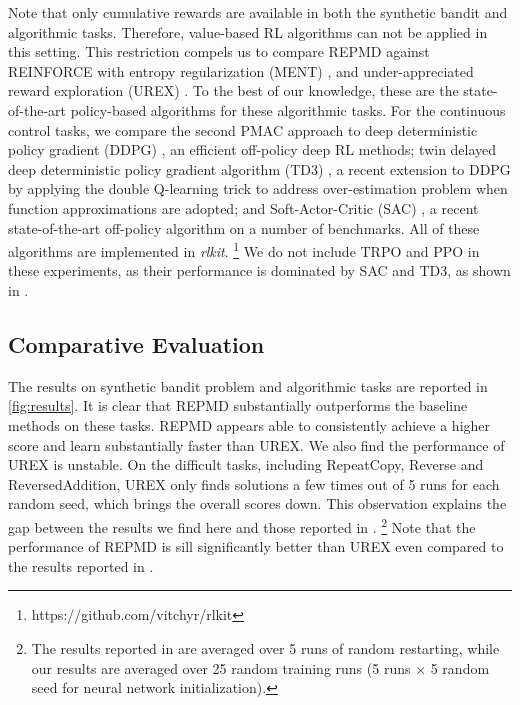 Note that only cumulative rewards are available in both the
synthetic bandit and algorithmic tasks.
Therefore, value-based RL algorithms can not be applied in this setting.
This restriction compels us to compare REPMD against
REINFORCE with entropy regularization (MENT) \citep{williams1992simple},
and under-appreciated reward exploration (UREX) \citep{nachum2017improving}.
To the best of our knowledge,
these
are the state-of-the-art policy-based algorithms for these algorithmic tasks. 
%
For the continuous control tasks, we compare the second PMAC approach
to deep deterministic policy gradient (DDPG) \citep{lillicrap2015continuous},
an efficient off-policy deep RL methods;
twin delayed deep deterministic policy gradient algorithm (TD3)
\citep{fujimoto2018addressing},
a recent extension to DDPG by applying the double Q-learning trick
to address over-estimation problem when function approximations are adopted;
and Soft-Actor-Critic (SAC) \citep{haarnoja2018soft},
a recent state-of-the-art off-policy algorithm on a number of benchmarks.
All of these algorithms are implemented in \emph{rlkit}.%
%
\footnote{
https://github.com/vitchyr/rlkit
} 
We do not include TRPO and PPO in these experiments,
as their performance is dominated by SAC and TD3,
as shown in \citep{haarnoja2018soft,fujimoto2018addressing}. 


\subsection{Comparative Evaluation}

The results on synthetic bandit problem and algorithmic tasks are reported 
in \cref{fig:results}. 
It is clear that REPMD substantially outperforms the baseline methods
on these tasks.
REPMD appears able to consistently achieve a higher score and
learn substantially faster than UREX.
We also find the performance of UREX is unstable.
On the difficult tasks, including RepeatCopy, Reverse and ReversedAddition,
UREX only finds solutions a few times out of 5 runs for each random seed,
which brings the overall scores down.
This observation explains the gap between the results we find here
and those reported in \citet{nachum2017improving}.%
%
\footnote{
The results reported in \citep{nachum2017improving} are averaged over 
5 runs of random restarting,
while our results are averaged over 25 random training runs
(5 runs $\times$ 5 random seed for neural network initialization). 
}
Note that the performance of REPMD is sill significantly better than
UREX even compared to the results reported in \citet{nachum2017improving}. 

